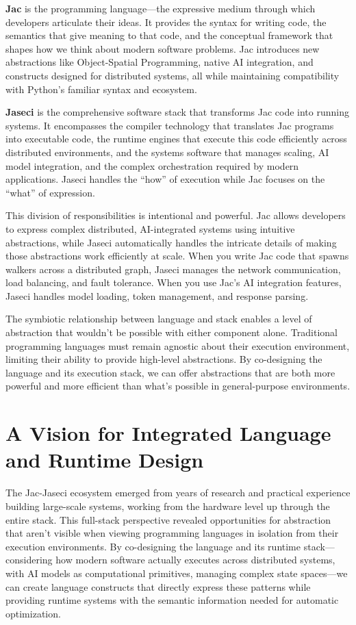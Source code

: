 \textbf{Jac} is the programming language—the expressive medium through which developers articulate their ideas. It provides the syntax for writing code, the semantics that give meaning to that code, and the conceptual framework that shapes how we think about modern software problems. Jac introduces new abstractions like Object-Spatial Programming, native AI integration, and constructs designed for distributed systems, all while maintaining compatibility with Python's familiar syntax and ecosystem.

\textbf{Jaseci} is the comprehensive software stack that transforms Jac code into running systems. It encompasses the compiler technology that translates Jac programs into executable code, the runtime engines that execute this code efficiently across distributed environments, and the systems software that manages scaling, AI model integration, and the complex orchestration required by modern applications. Jaseci handles the ``how'' of execution while Jac focuses on the ``what'' of expression.

This division of responsibilities is intentional and powerful. Jac allows developers to express complex distributed, AI-integrated systems using intuitive abstractions, while Jaseci automatically handles the intricate details of making those abstractions work efficiently at scale. When you write Jac code that spawns walkers across a distributed graph, Jaseci manages the network communication, load balancing, and fault tolerance. When you use Jac's AI integration features, Jaseci handles model loading, token management, and response parsing.

The symbiotic relationship between language and stack enables a level of abstraction that wouldn't be possible with either component alone. Traditional programming languages must remain agnostic about their execution environment, limiting their ability to provide high-level abstractions. By co-designing the language and its execution stack, we can offer abstractions that are both more powerful and more efficient than what's possible in general-purpose environments.

\section{A Vision for Integrated Language and Runtime Design}

The Jac-Jaseci ecosystem emerged from years of research and practical experience building large-scale systems, working from the hardware level up through the entire stack. This full-stack perspective revealed opportunities for abstraction that aren't visible when viewing programming languages in isolation from their execution environments. By co-designing the language and its runtime stack—considering how modern software actually executes across distributed systems, with AI models as computational primitives, managing complex state spaces—we can create language constructs that directly express these patterns while providing runtime systems with the semantic information needed for automatic optimization.

